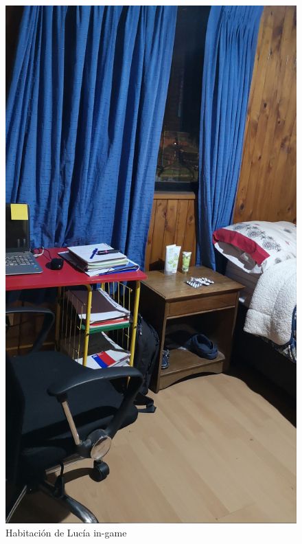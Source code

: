 \begin{figure}[ht]
\begin{minipage}{0.45\textwidth}
	\end{minipage}
	\begin{minipage}{0.45\textwidth}
		\begin{flushright}
	   		\includegraphics[scale=.3]{imgs/habitacion-noche.jpg}
		\end{flushright}
	\end{minipage}
	\caption{Habitación de Lucía in-game}
	\label{multifig:habitacion}
\end{figure}

